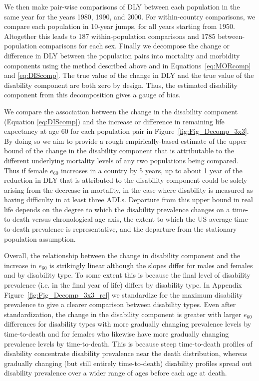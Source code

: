 \documentclass[11pt,oneside,a4paper]{article} %
\begin{document}
We then make pair-wise comparisons of DLY between each population in
the same year for the years 1980, 1990, and 2000.
For within-country comparisons, we compare each population in
10-year jumps, for all years starting from 1950. Altogether this leads to
187 within-population comparisons and 1785 between-population comparisons for
each sex. Finally we decompose the change or difference in DLY between the
population pairs into mortality and morbidity components using the
\citet{Nusselder2004} method described above and in
Equations~\eqref{eq:MORcomp} and \eqref{eq:DIScomp}. The
true value of the change in DLY and the true value of the disability component
are both zero by design. Thus, the estimated disability component from this
decomposition gives a gauge of bias.

We compare the association between the change in the disability component
(Equation \ref{eq:DIScomp}) and the increase or difference in remaining life
expectancy at age 60 for each population pair in
Figure~\ref{fig:Fig_Decomp_3x3}. By doing so we aim to provide a rough
empirically-based estimate of the upper bound of the change in the disability
component that is attributable to the different underlying mortality levels
of any two populations being compared. Thus if female $e_{60}$ increases in a
country by 5 years, up to about 1 year of the reduction in DLY that is
attributed to the disability component could be solely arising from the decrease
in mortality, in the case where disability is measured as having difficulty in
at least three ADLs. Departure from this upper bound in real life depends on
the degree to which the disability prevalence changes on a time-to-death versus chronological
age axis, the extent to which the US average time-to-death prevalence is
representative, and the departure from the stationary population assumption.

Overall, the relationship between the change in disability component and the
increase in $e_{60}$ is strikingly linear although the slopes differ for males
and females and by disability type. To some extent this is because the
final level of disability prevalence (i.e. in the final year of life) differs by
disability type.
In Appendix Figure~\ref{fig:Fig_Decomp_3x3_rel} we standardize for the maximum
disability prevalence to give a clearer comparison between disability types.
Even after standardization, the change in the disability component is
greater with larger $e_{60}$ differences for disability types with more
gradually changing prevalence levels by time-to-death and for females who
likewise have more gradually changing prevalence levels by time-to-death.
This is because steep time-to-death profiles of disability concentrate
disability prevalence near the death distribution,
whereas gradually changing (but still entirely time-to-death) disability
profiles spread out disability prevalence over a wider range of ages before
each age at death.
\end{document}
